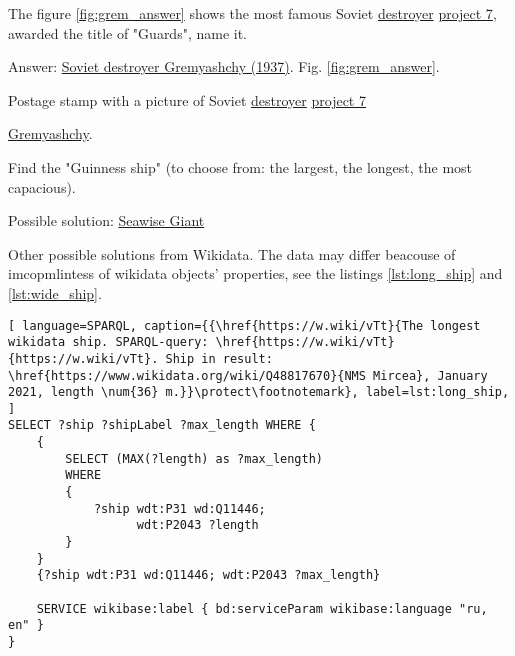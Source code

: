 
\begin{exercise}
	The figure \ref{fig:grem_answer} shows the most famous Soviet \href{https://en.wikipedia.org/wiki/Destroyer}{destroyer} \href{https://en.wikipedia.org/wiki/Gnevny-class_destroyer}{project 7}, awarded the title of "Guards", name it.
\end{exercise}

Answer: \href{https://en.wikipedia.org/wiki/Soviet_destroyer_Gremyashchy_(1937)}{Soviet destroyer Gremyashchy (1937)}. Fig. \ref{fig:grem_answer}.

\label{answer:ship_1}
\begin{marginfigure}[0.0cm]
	{
	  \setlength{\fboxsep}{0pt}%
	  \setlength{\fboxrule}{1pt}%
	}
	\caption{Postage stamp with a picture of Soviet \href{https://en.wikipedia.org/wiki/Destroyer}{destroyer} \href{https://en.wikipedia.org/wiki/Gnevny-class_destroyer}{project 7}} \href{https://en.wikipedia.org/wiki/Soviet_destroyer_Gremyashchy_(1937)}{Gremyashchy}.%
	\label{fig:grem_answer}%
\end{marginfigure}




\begin{exercise}
	\label{answer:ship_ex_1}
	Find the "Guinness ship" (to choose from: the largest, the longest, the most capacious).
\end{exercise}

Possible solution: \href{https://en.wikipedia.org/wiki/Seawise_Giant}{Seawise Giant}

Other possible solutions from Wikidata. The data may differ beacouse of imcopmlintess of wikidata objects' properties, see the listings \ref{lst:long_ship} and \ref{lst:wide_ship}.
\begin{lstlisting}[ language=SPARQL, caption={{\href{https://w.wiki/vTt}{The longest wikidata ship. SPARQL-query: \href{https://w.wiki/vTt}{https://w.wiki/vTt}. Ship in result: \href{https://www.wikidata.org/wiki/Q48817670}{NMS Mircea}, January 2021, length \num{36} m.}}\protect\footnotemark}, label=lst:long_ship, ]
SELECT ?ship ?shipLabel ?max_length WHERE {
	{
		SELECT (MAX(?length) as ?max_length)
		WHERE
		{
			?ship wdt:P31 wd:Q11446;
				  wdt:P2043 ?length
		}
	}
	{?ship wdt:P31 wd:Q11446; wdt:P2043 ?max_length}
			
	SERVICE wikibase:label { bd:serviceParam wikibase:language "ru, en" }
}  
\end{lstlisting}

